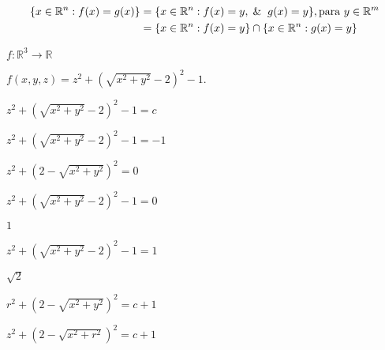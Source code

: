 \documentclass{article}
\def\lthtmlcheckvsize{\ifdim\ht\sizebox<\vsize 
  \ifdim\wd\sizebox<\hsize\expandafter\hfill\fi \expandafter\vfill
  \else\expandafter\vss\fi}%
\begin{document}
{\newpage\clearpage
{}%
\begin{displaymath}\begin{split}
\{x \in \mathbb{R}^n : f(x) = g(x) \} &= \{x \in \mathbb{R}^n : f(x) = y, \And g(x) = y\}, \text{para $y\in \mathbb{R}^m$} \\
& = \{x \in \mathbb{R}^n : f(x) = y\} \cap \{x \in \mathbb{R}^n : g(x) = y\}
\end{split}\end{displaymath}%
\lthtmldisplayZ
\lthtmlcheckvsize\clearpage}

{\newpage\clearpage
{}%
$ f:\mathbb{R}^3\rightarrow\mathbb{R}$%
\lthtmlindisplaymathZ
\lthtmlcheckvsize\clearpage}

{\newpage\clearpage
{}%
$ f(x,y,z)=z^2+(\sqrt{x^2+y^2}-2)^2-1.$%
\lthtmlindisplaymathZ
\lthtmlcheckvsize\clearpage}

{\newpage\clearpage
{}%
$ z^2+(\sqrt{x^2+y^2}-2)^2-1=c$%
\lthtmlindisplaymathZ
\lthtmlcheckvsize\clearpage}

{\newpage\clearpage
{}%
$ z^2+(\sqrt{x^2+y^2}-2)^2-1=-1$%
\lthtmlindisplaymathZ
\lthtmlcheckvsize\clearpage}

{\newpage\clearpage
{}%
$ z^2+(2-\sqrt{x^2+y^2})^2=0$%
\lthtmlindisplaymathZ
\lthtmlcheckvsize\clearpage}

{\newpage\clearpage
{}%
$ z^2+(\sqrt{x^2+y^2}-2)^2-1=0$%
\lthtmlindisplaymathZ
\lthtmlcheckvsize\clearpage}

{\newpage\clearpage
{}%
$ 1$%
\lthtmlindisplaymathZ
\lthtmlcheckvsize\clearpage}

{\newpage\clearpage
{}%
$ z^2+(\sqrt{x^2+y^2}-2)^2-1=1$%
\lthtmlindisplaymathZ
\lthtmlcheckvsize\clearpage}

{\newpage\clearpage
{}%
$ \sqrt{2}$%
\lthtmlindisplaymathZ
\lthtmlcheckvsize\clearpage}

{\newpage\clearpage
{}%
$ r^2+(2-\sqrt{x^2+y^2})^2=c+1$%
\lthtmlindisplaymathZ
\lthtmlcheckvsize\clearpage}

{\newpage\clearpage
{}%
$ z^2+(2-\sqrt{x^2+r^2})^2=c+1$%
\lthtmlindisplaymathZ
\lthtmlcheckvsize\clearpage}
\end{document}
